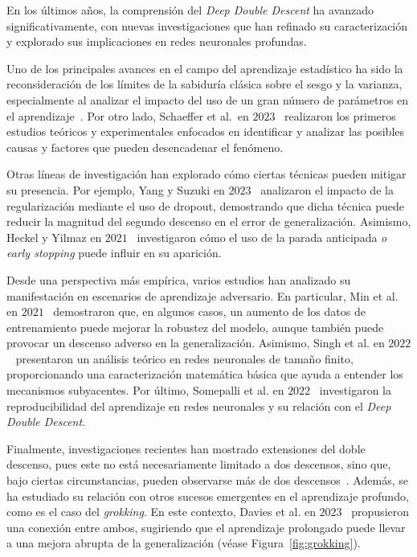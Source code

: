 En los últimos años, la comprensión del \textit{Deep Double Descent} ha avanzado significativamente, con nuevas investigaciones que han refinado su caracterización y explorado sus implicaciones en redes neuronales profundas.\newline

Uno de los principales avances en el campo del aprendizaje estadístico ha sido la reconsideración de los límites de la sabiduría clásica sobre el sesgo y la varianza, especialmente al analizar el impacto del uso de un gran número de parámetros en el aprendizaje~\cite{Zhang2021,Curth2023}. Por otro lado, Schaeffer et al.\ en $2023$~\cite{Schaeffer2023} realizaron los primeros estudios teóricos y experimentales enfocados en identificar y analizar las posibles causas y factores que pueden desencadenar el fenómeno.\newline

Otras líneas de investigación han explorado cómo ciertas técnicas pueden mitigar su presencia. Por ejemplo, Yang y Suzuki en $2023$~\cite{Yang2024} analizaron el impacto de la regularización mediante el uso de dropout, demostrando que dicha técnica puede reducir la magnitud del segundo descenso en el error de generalización. Asimismo, Heckel y Yilmaz en $2021$~\cite{Heckel2020} investigaron cómo el uso de la parada anticipada \emph{o early stopping} puede influir en su aparición.\newline

Desde una perspectiva más empírica, varios estudios han analizado su manifestación en escenarios de aprendizaje adversario. En particular, Min et al. en $2021$~\cite{Ming2020} demostraron que, en algunos casos, un aumento de los datos de entrenamiento puede mejorar la robustez del modelo, aunque también puede provocar un descenso adverso en la generalización. Asimismo, Singh et al. en $2022$~\cite{Singh2022} presentaron un análisis teórico en redes neuronales de tamaño finito, proporcionando una caracterización matemática básica que ayuda a entender los mecanismos subyacentes. Por último, Somepalli et al. en $2022$~\cite{Somepalli2022} investigaron la reproducibilidad del aprendizaje en redes neuronales y su relación con el \textit{Deep Double Descent}.\newline

Finalmente, investigaciones recientes han mostrado extensiones del doble descenso, pues este no está necesariamente limitado a dos descensos, sino que, bajo ciertas circunstancias, pueden observarse más de dos descensos~\cite{d_Ascoli2021, Chen2021}. Además, se ha estudiado su relación con otros sucesos emergentes en el aprendizaje profundo, como es el caso del \emph{grokking}. En este contexto, Davies et al. en $2023$~\cite{Davies2023} propusieron una conexión entre ambos, sugiriendo que el aprendizaje prolongado puede llevar a una mejora abrupta de la generalización (véase Figura~\ref{fig:grokking}).\newline

